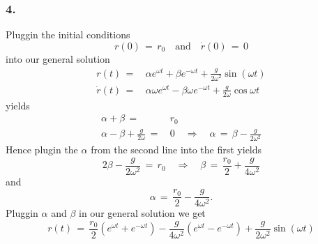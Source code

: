\subsubsection{4.}
Pluggin the initial conditions
\begin{equation*}
  r(0) \,=\, r_0 \quad \text{and} \quad \dot r(0) \,=\, 0 
\end{equation*}
into our general solution
\begin{align*}
  r(t) \,=\,& \alpha e^{\omega t} + \beta e^{-\omega t} + \frac{g}{2\omega^2}
\sin(\omega t) \\
  \dot r(t) \,=\,& \alpha \omega e^{\omega t} - \beta \omega e^{-\omega t} +
\frac{g}{2\omega} \cos{\omega t}
\end{align*}
yields
\begin{align*}
  \alpha + \beta \,=\,& r_0 \\
  \alpha - \beta + \frac{g}{2\omega} \,=\,& 0 \quad \Rightarrow \quad \alpha
\,=\, \beta - \frac{g}{2\omega^2}
\end{align*}
Hence plugin the $\alpha$ from the second line into the first yields
\begin{equation*}
  2\beta - \frac{g}{2\omega^2} \,=\, r_0 \quad \Rightarrow \quad \beta \,=\,
\frac{r_0}{2} + \frac{g}{4\omega^2}
\end{equation*}
and 
\begin{equation*}
  \alpha \,=\, \frac{r_0}{2} - \frac{g}{4\omega^2}.
\end{equation*}
Pluggin $\alpha$ and $\beta$ in our general solution we get
\begin{equation*}
  r(t) \,=\, \frac{r_0}{2} \left(e^{\omega t} + e^{-\omega t}\right) -
\frac{g}{4\omega^2} \left(e^{\omega t} - e^{-\omega t}\right) +
\frac{g}{2\omega^2} \sin(\omega t)
\end{equation*}
